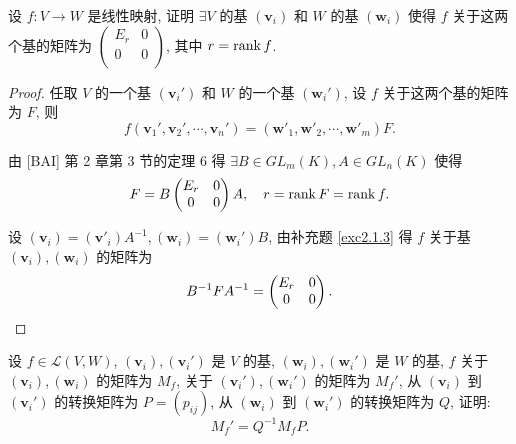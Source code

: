 \documentclass[color=black,device=normal,lang=cn,mode=geye]{elegantnote}
\begin{document}
\begin{exercisec}[2.1.2]
    设 $f:V\to W$ 是线性映射, 证明 $\exists V$ 的基 $(\boldsymbol{v}_i)$ 和 $W$ 的基 $(\boldsymbol{w}_i)$ 使得 $f$ 关于这两个基的矩阵为 $\begin{pmatrix}
        E_r & 0 \\
        0 & 0 \\
    \end{pmatrix}$, 其中 $r=\operatorname{rank} f$.
\end{exercisec}
\begin{proof}
    任取 $V$ 的一个基 $(\boldsymbol{v}_i')$ 和 $W$ 的一个基 $(\boldsymbol{w}_i')$, 设 $f$ 关于这两个基的矩阵为 $F$, 则
    \[f(\boldsymbol{v}_1',\boldsymbol{v}_2',\cdots,\boldsymbol{v}_n')=(\boldsymbol{w}'_1,\boldsymbol{w}'_2,\cdots,\boldsymbol{w}'_m)F.\]

    由 [BAI] 第 2 章第 3 节的定理 6 得 $\exists B\in GL_m(K),A\in GL_n(K)$ 使得
    \[F=B\begin{pmatrix}
        E_r & 0 \\
        0 & 0 \\
    \end{pmatrix}A,\quad r=\operatorname{rank} F=\operatorname{rank} f.\]

    设 $(\boldsymbol{v}_i)=(\boldsymbol{v}'_i)A^{-1},(\boldsymbol{w}_i)=(\boldsymbol{w}_i')B$, 由补充题 \ref{exc2.1.3} 得 $f$ 关于基 $(\boldsymbol{v}_i),(\boldsymbol{w}_i)$ 的矩阵为
    \[B^{-1}FA^{-1}=\begin{pmatrix}
        E_r & 0 \\
        0 & 0 \\
    \end{pmatrix}.\qedhere\]
\end{proof}
\begin{exercisec}[2.1.3]\label{exc2.1.3}
    设 $f\in\mathcal{L}(V,W)$, $(\boldsymbol{v}_i),(\boldsymbol{v}_i')$ 是 $V$ 的基, $(\boldsymbol{w}_i),(\boldsymbol{w}_i')$ 是 $W$ 的基, $f$ 关于 $(\boldsymbol{v}_i),(\boldsymbol{w}_i)$ 的矩阵为 $M_f$, 关于 $(\boldsymbol{v}_i'),(\boldsymbol{w}_i')$ 的矩阵为 $M_f'$, 从 $(\boldsymbol{v}_i)$ 到 $(\boldsymbol{v}_i')$ 的转换矩阵为 $P=(p_{ij})$, 从 $(\boldsymbol{w}_i)$ 到 $(\boldsymbol{w}_i')$ 的转换矩阵为 $Q$, 证明:
    \[M_f'=Q^{-1}M_fP.\]
\end{exercisec}
\end{document}
